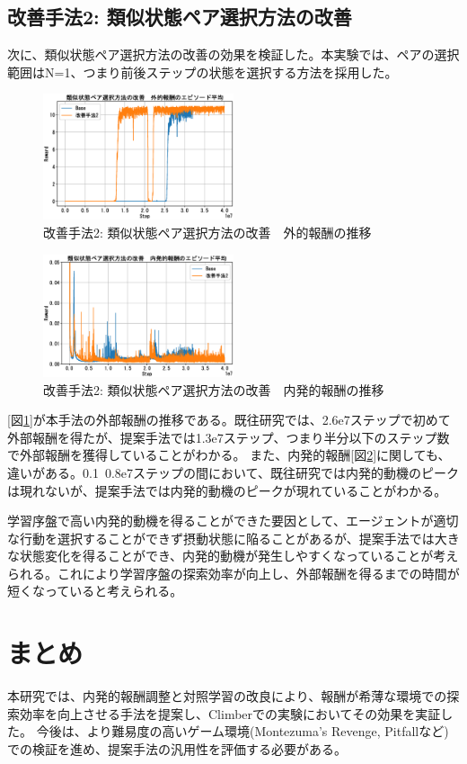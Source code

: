 \subsection{改善手法2: 類似状態ペア選択方法の改善}
次に、類似状態ペア選択方法の改善の効果を検証した。本実験では、ペアの選択範囲はN=1、つまり前後ステップの状態を選択する方法を採用した。
\begin{figure}[h]
   \centering
   \includegraphics[width=0.5\textwidth]{Method2_Ext.eps}
   \caption{改善手法2: 類似状態ペア選択方法の改善　外的報酬の推移}\label{fig5:figure5}
\end{figure}
\begin{figure}[h]
   \centering
   \includegraphics[width=0.5\textwidth]{Method2_Intr.eps}
   \caption{改善手法2: 類似状態ペア選択方法の改善　内発的報酬の推移}\label{fig6:figure6}
\end{figure}
[図\ref{fig5:figure5}]が本手法の外部報酬の推移である。既往研究では、2.6e7ステップで初めて外部報酬を得たが、提案手法では1.3e7ステップ、つまり半分以下のステップ数で外部報酬を獲得していることがわかる。
また、内発的報酬[図\ref{fig6:figure6}]に関しても、違いがある。0.1~0.8e7ステップの間において、既往研究では内発的動機のピークは現れないが、提案手法では内発的動機のピークが現れていることがわかる。

学習序盤で高い内発的動機を得ることができた要因として、エージェントが適切な行動を選択することができず摂動状態に陥ることがあるが、提案手法では大きな状態変化を得ることができ、内発的動機が発生しやすくなっていることが考えられる。これにより学習序盤の探索効率が向上し、外部報酬を得るまでの時間が短くなっていると考えられる。

\section{まとめ}
本研究では、内発的報酬調整と対照学習の改良により、報酬が希薄な環境での探索効率を向上させる手法を提案し、Climberでの実験においてその効果を実証した。
今後は、より難易度の高いゲーム環境(Montezuma's Revenge, Pitfallなど)での検証を進め、提案手法の汎用性を評価する必要がある。


